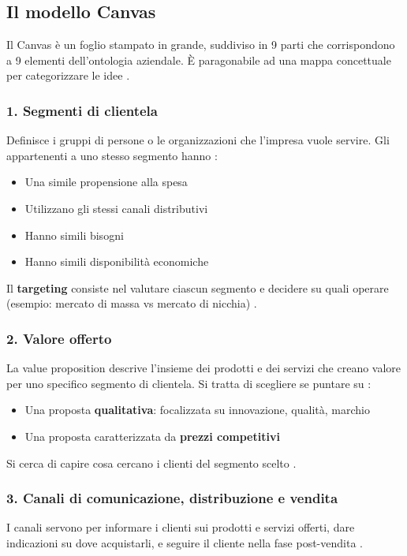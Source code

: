 \documentclass[12pt,a4paper]{article}
\begin{document}
\subsection{Il modello Canvas}
Il Canvas è un foglio stampato in grande, suddiviso in 9 parti che corrispondono a 9 elementi dell'ontologia aziendale. È paragonabile ad una mappa concettuale per categorizzare le idee .

\subsubsection{1. Segmenti di clientela}
Definisce i gruppi di persone o le organizzazioni che l'impresa vuole servire. Gli appartenenti a uno stesso segmento hanno :
\begin{itemize}
    \item Una simile propensione alla spesa
    \item Utilizzano gli stessi canali distributivi
    \item Hanno simili bisogni
    \item Hanno simili disponibilità economiche
\end{itemize}

Il \textbf{targeting} consiste nel valutare ciascun segmento e decidere su quali operare (esempio: mercato di massa vs mercato di nicchia) .

\subsubsection{2. Valore offerto}
La value proposition descrive l'insieme dei prodotti e dei servizi che creano valore per uno specifico segmento di clientela. Si tratta di scegliere se puntare su :
\begin{itemize}
    \item Una proposta \textbf{qualitativa}: focalizzata su innovazione, qualità, marchio
    \item Una proposta caratterizzata da \textbf{prezzi competitivi}
\end{itemize}

Si cerca di capire cosa cercano i clienti del segmento scelto .

\subsubsection{3. Canali di comunicazione, distribuzione e vendita}
I canali servono per informare i clienti sui prodotti e servizi offerti, dare indicazioni su dove acquistarli, e seguire il cliente nella fase post-vendita .
\end{document}
